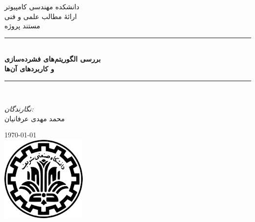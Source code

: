 \newcommand{\HRule}{\rule{\linewidth}{0.1mm}} 
\center %
 
    \textsc{\Large دانشکده مهندسی کامپیوتر}\\[0.5cm] %
    \textsc{\Large ارائهٔ مطالب علمی و فنی}\\[0.5cm] %
    \textsc{\large مستند پروژه}\\[0.5cm] %

\HRule \\[0.4cm]
    { \huge \bfseries بررسی الگوریتم‌های فشرده‌سازی \\و کاربردهای آن‌ها}\\[0.1cm] %
\HRule \\[1.5cm]
 
\begin{minipage}{0.4\textwidth}
\begin{center}

 \large
    
    \emph{نگارندگان:}\\
    محمد مهدی عرفانیان\\
    \end{center}
\end{minipage}
\vspace{10mm}

{\large \today}\\[1cm] %
\includegraphics{figs/sharif.png}%
\vfill %